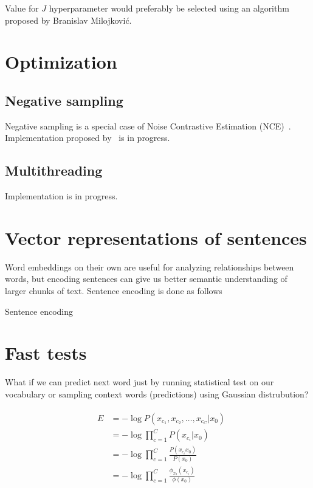 \documentclass{article}
\newcommand{\SetAlgoStyle}{
	\SetAlgoNoLine
	\SetAlgoNoEnd
	\DontPrintSemicolon
}
\begin{document}
\medbreak

Value for $J$ hyperparameter would preferably be selected using an algorithm proposed by Branislav Milojković.

\section{Optimization}

\subsection{Negative sampling}

Negative sampling is a special case of Noise Contrastive Estimation (NCE)~\cite{1206.6426}.
Implementation proposed by~\cite{1704.03956} is in progress.

\subsection{Multithreading}

Implementation is in progress.

\section{Vector representations of sentences}

Word embeddings on their own are useful for analyzing relationships between
words, but encoding sentences can give us better semantic understanding of
larger chunks of text. Sentence encoding is done as follows

\begin{algorithm}[H]
	\caption{Sentence encoding}
	\SetAlgoStyle
\end{algorithm}

\section{Fast tests}

What if we can predict next word just by running statistical test on our vocabulary or
sampling context words (predictions) using Gaussian distrubution?

\begin{align}	
	&\begin{aligned}	
		E &= -\log P(x_{c_1}, x_{c_2},\ldots,x_{c_C}|x_0) \\
		&= -\log \prod_{c=1}^C P(x_{c_i}|x_0) \\
		&= -\log \prod_{c=1}^C \frac{P(x_{c_i}x_0)}{P(x_0)} \\
		&= -\log \prod_{c=1}^C \frac{\phi_{x_0}(x_{c_i})}{\phi(x_0)}
	\end{aligned}
\end{align}
\end{document}
